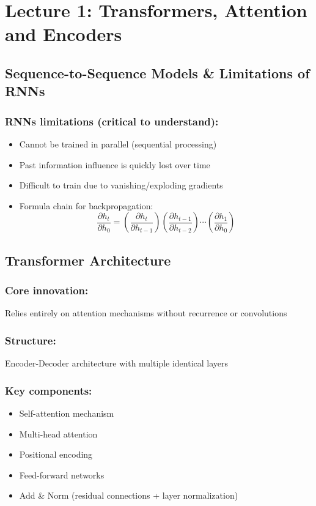 \chapter{\normalsize Lecture 1: Transformers, Attention and Encoders}



\section{Sequence-to-Sequence Models \& Limitations of RNNs}

\subsection*{RNNs limitations (critical to understand):}
\begin{itemize}
    \item Cannot be trained in parallel (sequential processing)
    \item Past information influence is quickly lost over time
    \item Difficult to train due to vanishing/exploding gradients
    \item Formula chain for backpropagation:
    \[
    \frac{\partial h_t}{\partial h_0} = \left(\frac{\partial h_t}{\partial h_{t-1}}\right) \left(\frac{\partial h_{t-1}}{\partial h_{t-2}}\right) \cdots \left(\frac{\partial h_1}{\partial h_0}\right)
    \]
\end{itemize}


\section{Transformer Architecture}

\subsection*{Core innovation:}
Relies entirely on attention mechanisms without recurrence or convolutions

\subsection*{Structure:}
Encoder-Decoder architecture with multiple identical layers

\subsection*{Key components:}
\begin{itemize}
    \item Self-attention mechanism
    \item Multi-head attention
    \item Positional encoding
    \item Feed-forward networks
    \item Add \& Norm (residual connections + layer normalization)
\end{itemize}

